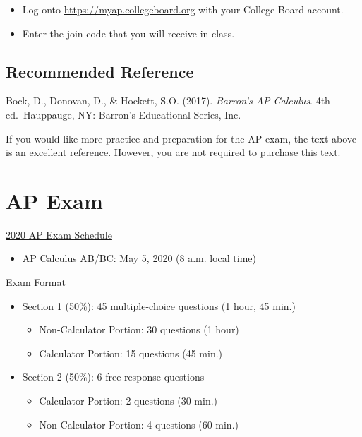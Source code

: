 \documentclass[12pt,fleqn]{article}
\providecommand{\tightlist}{%
  \setlength{\itemsep}{0pt}\setlength{\parskip}{0pt}}
\begin{document}
\begin{itemize}
\item
  Log onto \url{https://myap.collegeboard.org} with your College Board account.
\item
  Enter the join code that you will receive in class.
\end{itemize}

\hypertarget{recommended-reference}{%
\subsection{Recommended Reference}\label{recommended-reference}}

Bock, D., Donovan, D., \& Hockett, S.O. (2017). \emph{Barron's AP
Calculus}. 4th ed.~Hauppauge, NY: Barron's Educational Series,
Inc.

If you would like more practice and preparation for the AP exam, the text above is an excellent reference. However, you are not required to purchase this text.

\hypertarget{ap-exam}{%
\section{AP Exam}\label{ap-exam}}

\href{https://apcentral.collegeboard.org/courses/exam-dates-and-fees/exam-dates-2020}{2020 AP Exam Schedule}

\begin{itemize}
\tightlist
\item
  AP Calculus AB/BC: May 5, 2020 (8 a.m. local time)
\end{itemize}

\href{https://apcentral.collegeboard.org/courses/ap-calculus-ab/exam}{Exam Format}

\begin{itemize}
\tightlist
\item
  Section 1 (50\%): 45 multiple-choice questions (1 hour, 45 min.)

  \begin{itemize}
  \tightlist
  \item
    Non-Calculator Portion: 30 questions (1 hour)
  \item
    Calculator Portion: 15 questions (45 min.)
  \end{itemize}
\item
  Section 2 (50\%): 6 free-response questions

  \begin{itemize}
  \tightlist
  \item
    Calculator Portion: 2 questions (30 min.)
  \item
    Non-Calculator Portion: 4 questions (60 min.)
  \end{itemize}
\end{itemize}
\end{document}
